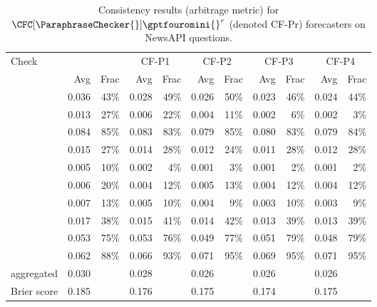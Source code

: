 {\begin{table}[htbp]
\caption{Consistency results (arbitrage metric) for $\CFC[\ParaphraseChecker{}]{\gptfouromini{}}^r$ (denoted CF-Pr) forecasters on NewsAPI questions.}
\begin{tabular}{lrrrrrrrrrr}
\toprule
Check & \multicolumn{2}{c}{\gptfouromini{}} & \multicolumn{2}{c}{CF-P1} & \multicolumn{2}{c}{CF-P2} & \multicolumn{2}{c}{CF-P3} & \multicolumn{2}{c}{CF-P4} \\
 & Avg & Frac & Avg & Frac & Avg & Frac & Avg & Frac & Avg & Frac \\
\midrule
\NegChecker{} & 0.036 & 43\% & 0.028 & 49\% & 0.026 & 50\% & 0.023 & 46\% & 0.024 & 44\% \\
\ParaphraseChecker{} & 0.013 & 27\% & 0.006 & 22\% & 0.004 & 11\% & 0.002 & 6\% & 0.002 & 3\% \\
\CondCondChecker{} & 0.084 & 85\% & 0.083 & 83\% & 0.079 & 85\% & 0.080 & 83\% & 0.079 & 84\% \\
\ExpectedEvidenceChecker{} & 0.015 & 27\% & 0.014 & 28\% & 0.012 & 24\% & 0.011 & 28\% & 0.012 & 28\% \\
\ConsequenceChecker{} & 0.005 & 10\% & 0.002 & 4\% & 0.001 & 3\% & 0.001 & 2\% & 0.001 & 2\% \\
\AndChecker{} & 0.006 & 20\% & 0.004 & 12\% & 0.005 & 13\% & 0.004 & 12\% & 0.004 & 12\% \\
\OrChecker{} & 0.007 & 13\% & 0.005 & 10\% & 0.004 & 9\% & 0.003 & 10\% & 0.003 & 9\% \\
\AndOrChecker{} & 0.017 & 38\% & 0.015 & 41\% & 0.014 & 42\% & 0.013 & 39\% & 0.013 & 39\% \\
\ButChecker{} & 0.053 & 75\% & 0.053 & 76\% & 0.049 & 77\% & 0.051 & 79\% & 0.048 & 79\% \\
\CondChecker{} & 0.062 & 88\% & 0.066 & 93\% & 0.071 & 95\% & 0.069 & 95\% & 0.071 & 95\% \\
aggregated & 0.030 &  & 0.028 &  & 0.026 &  & 0.026 &  & 0.026 &  \\
Brier score & 0.185 &  & 0.176 &  & 0.175 &  & 0.174 &  & 0.175 &  \\
\bottomrule
\end{tabular}
\label{cfc:tab:cf-px}
\end{table}

}
